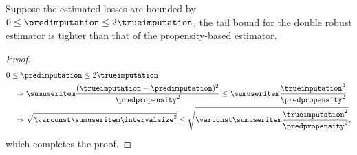 \begin{theorem}
\label{thm:variance}
Suppose the estimated losses are bounded by $0\leq\predimputation\leq 2\trueimputation$, the tail bound for the double robust estimator is tighter than that of the propensity-based estimator.
\end{theorem}%
\begin{proof}
\begin{equation*}
\begin{aligned}
&
0\leq\predimputation\leq 2\trueimputation
\\&\quad\Rightarrow
\sumuseritem\frac{(\trueimputation-\predimputation)^{2}}{\predpropensity^{2}}
\leq
\sumuseritem\frac{\trueimputation^{2}}{\predpropensity^{2}}
\\&\quad\Rightarrow
\sqrt{
\varconst
\sumuseritem\intervalsize^{2}
}
\leq
\sqrt{
\varconst
\sumuseritem\frac{\trueimputation^{2}}{\predpropensity^{2}}
}
\text{,}
\end{aligned}
\end{equation*}%
which completes the proof.
\end{proof}


